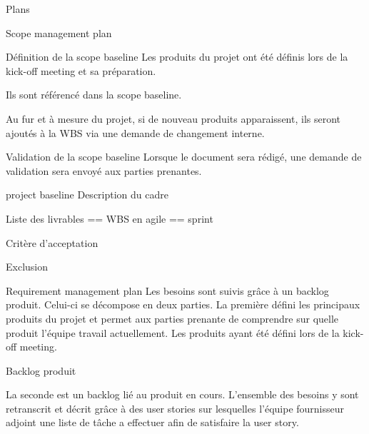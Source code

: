\documentclass[]{article}
\begin{document}
\begin{section}{Plans}
 \begin{subsection}{Scope management plan}

     \begin{subsubsection}{Définition de la scope baseline}
         Les produits du projet ont été définis lors de la kick-off meeting et sa préparation.

         Ils sont référencé dans la scope baseline.

         Au fur et à mesure du projet, si de nouveau produits apparaissent, ils seront ajoutés à la WBS via une demande de changement interne.
     \end{subsubsection}

     \begin{subsubsection}{Validation de la scope baseline}
         Lorsque le document sera rédigé, une demande de validation sera envoyé aux parties prenantes.
     \end{subsubsection}

 \end{subsection}

 \begin{subsection}{project baseline}
     Description du cadre

     Liste des livrables == WBS en agile == sprint

     Critère d'acceptation

     Exclusion

 \end{subsection}

 \begin{subsection}{Requirement management plan}
     Les besoins sont suivis grâce à un backlog produit. Celui-ci se décompose en deux parties. La première défini les principaux produits du projet et permet aux parties prenante de comprendre sur quelle produit l'équipe travail actuellement. Les produits ayant été défini lors de la kick-off meeting.

     \begin{subsubsection}{Backlog produit}

         La seconde est un backlog lié au produit en cours. L'ensemble des besoins y sont retranscrit et décrit grâce à des user stories sur lesquelles l'équipe fournisseur adjoint une liste de tâche a effectuer afin de satisfaire la user story.


\end{subsubsection}
\end{subsection}
\end{section}
\end{document}
